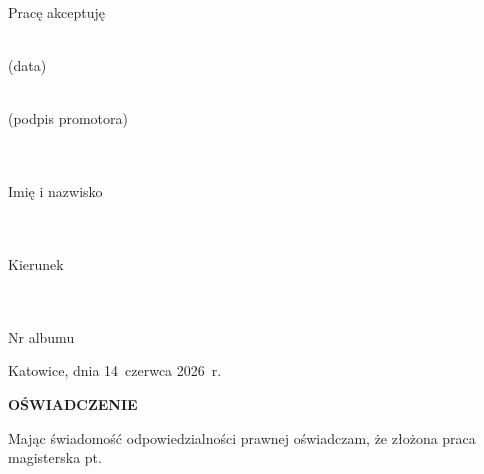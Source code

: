\vspace{0.45cm}
\noindent Pracę akceptuję

\vspace{0.85cm}
\begin{minipage}{2in}
\begin{center}
\dotfill \\
(data)
\end{center}
\end{minipage}
\hfill
\begin{minipage}{2in}
\begin{center}
\dotfill \\
(podpis promotora)
\end{center}
\end{minipage}

\newpage

\begingroup
\fontsize{11}{14}\selectfont
\vspace*{0.1cm}
\noindent
\begin{minipage}[t]{0.42\textwidth}
\begin{center}
\makebox[\linewidth]{\thesisauthor}\\[-0.15cm]
\dotfill\\[-0.2cm]
Imię i nazwisko

\vspace{0.2cm}
\makebox[\linewidth]{\thesisfield}\\[-0.15cm]
\dotfill\\[-0.2cm]
Kierunek

\vspace{0.2cm}
\makebox[\linewidth]{\thesisalbum}\\[-0.15cm]
\dotfill\\[-0.2cm]
Nr albumu
\end{center}
\end{minipage}
\hfill
\begin{minipage}[t]{0.52\textwidth}
 \begin{flushright}
Katowice, dnia 14~czerwca 2026~r.
 \end{flushright}
\end{minipage}

\vspace{0.25cm}
\begin{center}
    \textbf{OŚWIADCZENIE}
\end{center}

\vspace{0.1cm}
\noindent Mając świadomość odpowiedzialności prawnej oświadczam, że złożona praca magisterska pt.

